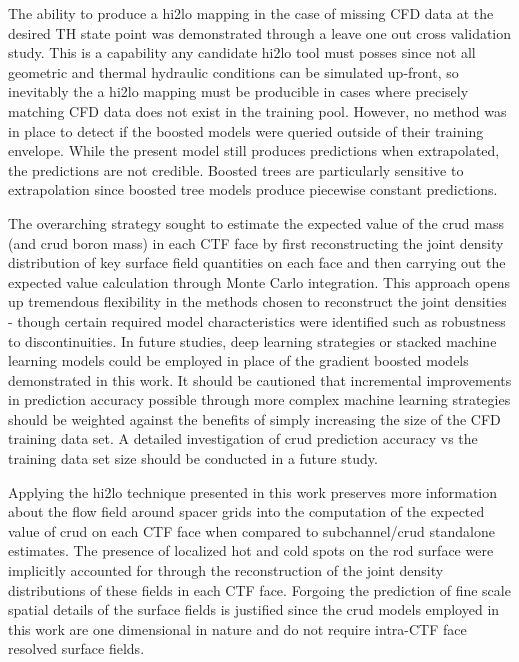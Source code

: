 The ability to produce a hi2lo mapping in the case of missing CFD data at the desired TH state point was demonstrated through a leave one out cross validation study.  This is a capability any candidate hi2lo tool must posses since not all geometric and thermal hydraulic conditions can be simulated up-front, so inevitably the a hi2lo mapping must be producible in cases where precisely matching CFD data does not exist in the training pool. However, no method was in place to detect if the boosted models were queried outside of their training envelope.  While the present model still produces predictions when extrapolated, the predictions are not credible.  Boosted trees are particularly sensitive to extrapolation since boosted tree models produce piecewise constant predictions.

The overarching strategy sought to estimate the expected value of the crud mass (and crud boron mass) in each CTF face by first reconstructing the joint density distribution of key surface field quantities on each face and then carrying out the expected value calculation through Monte Carlo integration.  This approach opens up tremendous flexibility in the methods chosen to reconstruct the joint densities - though certain required model characteristics were identified such as robustness to discontinuities.  In future studies, deep learning strategies or stacked machine learning models could be employed in place of the gradient boosted models demonstrated in this work.  It should be cautioned that incremental improvements in prediction accuracy possible through more complex  machine learning strategies should be weighted against the benefits of simply increasing the size of the CFD training data set.  A detailed investigation of crud prediction accuracy vs the training data set size should be conducted in a future study.

Applying the hi2lo technique presented in this work preserves more information about the flow field around spacer grids into the computation of the expected value of crud on each CTF face when compared to subchannel/crud standalone estimates.  The presence of localized hot and cold spots on the rod surface were implicitly accounted for through the reconstruction of the joint density distributions of these fields in each CTF face.  Forgoing the prediction of fine scale spatial details of the surface fields is justified since the crud models employed in this work are one dimensional in nature and do not require intra-CTF face resolved surface fields.

